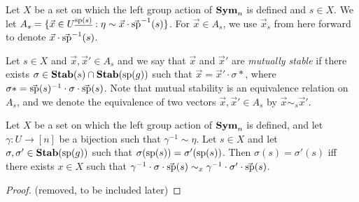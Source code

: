 \documentclass[../paper.tex]{subfiles}
\begin{document}
Let $X$ be a set on which the left group action of $\text{\textbf{Sym}}_n$ is defined and $s
\in X$. We let $A_s = \{\vec{x} \in U^{\underline{\text{sp}(s)}} : \eta \sim
\vec{x} \cdot \vec{\text{sp}}^{-1}(s) \}$. For $\vec{x} \in A_s$, we use
$\vec{x}_s$ from here forward to denote $\vec{x} \cdot \vec{\text{sp}}^{-1}(s)$.

Let $s \in X$ and $\vec{x}, \vec{x}' \in A_s$ and we say that $\vec{x}$ and
$\vec{x}'$ are \emph{mutually stable} if there exists $\sigma \in \text{\textbf{Stab}}(s) \cap
\text{\textbf{Stab}} (\text{sp} (g))$ such that $\vec{x} = \vec{x}' \cdot \sigma*$, where $\sigma* =
\vec{\text{sp}}(s)^{-1} \cdot \sigma \cdot \vec{\text{sp}}(s)$. Note that mutual
stability is an equivalence relation on $A_s$, and we denote the equivalence of
two vectors $\vec{x}, \vec{x}' \in A_s$ by $\vec{x} \sim_s \vec{x}'$.

\begin{lem}
  Let $X$ be a set on which the left group action of $\text{\textbf{Sym}}_n$ is defined, and
  let $\gamma: U \rightarrow [n]$ be a bijection such that $\gamma^{-1} \sim
  \eta$. Let $s \in X$ and let $\sigma, \sigma' \in \text{\textbf{Stab}}(\text{sp}(g))$ such that
  $\sigma (\text{sp}(s)) = \sigma'(\text{sp}(s))$. Then $\sigma(s) = \sigma' (s)$ iff
  there exists $x \in X$ such that $\gamma^{-1} \cdot \sigma \cdot
  \vec{\text{sp}}(s) \sim_x \gamma^{-1} \cdot \sigma' \cdot \vec{\text{sp}}(s)$.
  \label{lem:functions-well-defined}
\end{lem}

\begin{proof}
  (removed, to be included later)
\end{proof}


\end{document}
